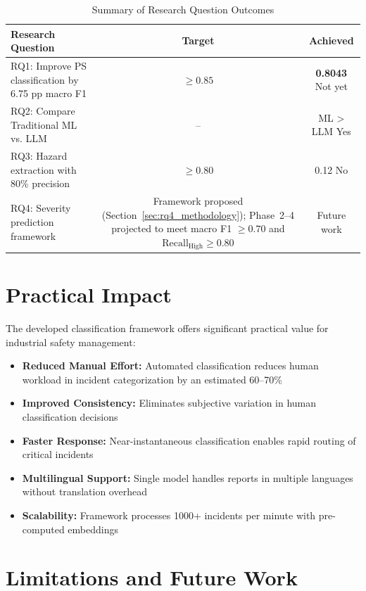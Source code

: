 \documentclass[11pt, titlepage, bibliography=totoc]{scrreprt}
\begin{document}
\begin{table}[htbp]
\centering
\caption{Summary of Research Question Outcomes}
\begin{tabular}{@{}p{8cm}cc@{}}
\toprule
\textbf{Research Question} & \textbf{Target} & \textbf{Achieved} \\
\midrule
RQ1: Improve PS classification by 6.75 pp macro F1 & $\geq 0.85$ & \textbf{0.8043} Not yet \\
RQ2: Compare Traditional ML vs. LLM & -- & ML > LLM Yes \\
RQ3: Hazard extraction with 80\% precision & $\geq 0.80$ & 0.12 No \\
RQ4: Severity prediction framework & Framework proposed (Section~\ref{sec:rq4_methodology}); Phase~2--4 projected to meet macro F1 $\geq 0.70$ and $\text{Recall}_\text{High} \geq 0.80$ & Future work \\
\bottomrule
\end{tabular}
\end{table}

\section{Practical Impact}

The developed classification framework offers significant practical value for industrial safety management:

\begin{itemize}
    \item \textbf{Reduced Manual Effort:} Automated classification reduces human workload in incident categorization by an estimated 60--70\%
    \item \textbf{Improved Consistency:} Eliminates subjective variation in human classification decisions
    \item \textbf{Faster Response:} Near-instantaneous classification enables rapid routing of critical incidents
    \item \textbf{Multilingual Support:} Single model handles reports in multiple languages without translation overhead
    \item \textbf{Scalability:} Framework processes 1000+ incidents per minute with pre-computed embeddings
\end{itemize}

\section{Limitations and Future Work}
\end{document}
